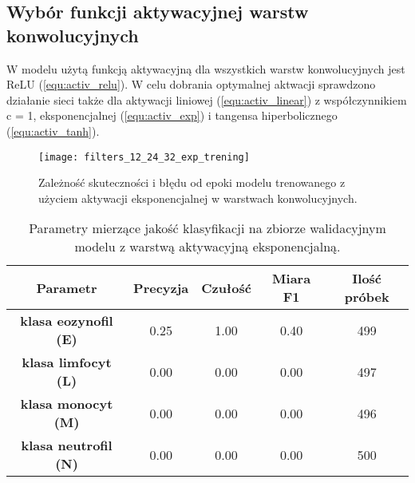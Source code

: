 \subsection{Wybór funkcji aktywacyjnej warstw konwolucyjnych}

W modelu użytą funkcją aktywacyjną dla wszystkich warstw konwolucyjnych jest ReLU (\ref{equ:activ_relu}). W celu dobrania optymalnej aktwacji sprawdzono działanie sieci także dla aktywacji liniowej (\ref{equ:activ_linear}) z współczynnikiem c = 1, eksponencjalnej (\ref{equ:activ_exp}) i tangensa hiperbolicznego (\ref{equ:activ_tanh}). 

\begin{figure}[h!]
	\centering
	\centering
		\texttt{[image: filters\_12\_24\_32\_exp\_trening]}	
	\caption{Zależność skuteczności i błędu od epoki modelu trenowanego z użyciem aktywacji eksponencjalnej w warstwach konwolucyjnych.}\label{fig:filters_12_24_32_exp_trening}
\end{figure}

\begin{table}[h!]
\centering
\caption[Short Heading]{Parametry mierzące jakość klasyfikacji na zbiorze walidacyjnym modelu z warstwą aktywacyjną eksponencjalną.}
\label{tab:exp_act_layers_params_val}
\begin{tabular}{|c|c|c|c|c|}
\hline
\textbf{Parametr}                               & \textbf{Precyzja} & \textbf{Czułość} & \textbf{Miara F1} & \textbf{Ilość próbek} \\ \hline
\textbf{klasa eozynofil (E)} & 0.25   & 1.00   & 0.40 & 499  \\ \hline
\textbf{klasa limfocyt (L)}& 0.00   & 0.00   & 0.00 & 497  \\ \hline
\textbf{klasa monocyt (M)} & 0.00   & 0.00   & 0.00 & 496  \\ \hline
\textbf{klasa neutrofil (N)} & 0.00   & 0.00    & 0.00  & 500  \\ \hline
\end{tabular}
\end{table}

